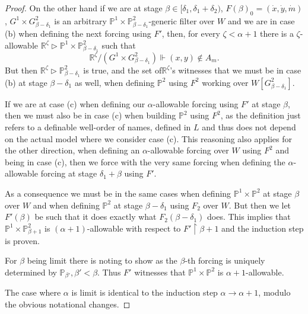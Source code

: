 \documentclass[a4paper,11pt]{article}
\newcommand{\forceP}{\mathbb{P}}
\newcommand{\forceR}{\mathbb{R}}
\begin{document}
\begin{proof}
On the other hand if we are at stage $\beta \in [\delta_1, \delta_1+\delta_2)$, $F({\beta})_0= (\dot{x},\dot{y}, \dot{m})$, $G^1 \times G^2_{\beta-\delta_1}$ is an arbitrary $\forceP^1 \times \forceP^2_{\beta-\delta_1}$-generic filter over $W$ and we are in case (b) when defining the next forcing using $F'$, then, for every $\zeta < \alpha+1$ there is a $\zeta$-allowable $\forceR^{\zeta}  \triangleright \forceP^1 \times \forceP^2_{{\beta-\delta_1}}$ such that
\[ \forceR^{\zeta}\slash (G^1 \times G^2_{\beta-\delta_1} )\Vdash ({x},{y}) \notin A_m.\]  But then $\forceR^{\zeta} \triangleright \forceP^2_{{\beta-\delta_1}}$ is true, and the set  of$\forceR^{\zeta}$'s witnesses that we must be in case (b) at stage $\beta-\delta_1$ as well, when defining $\forceP^2$ using $F^2$ working over $W[G^2_{\beta-\delta_1}]$.


If we are at case (c) when defining our  $\alpha$-allowable forcing using $F'$ at stage $\beta$, then we must also be in case (c) when building $\forceP^2$ using $F^2$, as the definition just refers to a definable well-order of names, defined in $L$ and thus does not depend on the actual  model where we consider case (c). This reasoning also applies for the other direction, when defining an $\alpha$-allowable forcing over $W$ using $F^2$ and being in case (c), then we force with the very same forcing when
defining the $\alpha$-allowable forcing at stage $\delta_1 +\beta$ using $F'$. 


As a consequence we must be in the same cases when defining $\forceP^1 \times \forceP^2$ at stage $\beta$ over $W$ and when defining $\forceP^2$ at stage $\beta -\delta_1$ using $F_2$ over $W$. But then we let $F'(\beta)$ be such that it does exactly what $F_2(\beta-\delta_1)$ does. This implies that $\forceP^1 \times \forceP^2_{\beta+1}$ is $(\alpha+1)$-allowable with respect to $F' \upharpoonright \beta+1$ and the induction step is proven.

For $\beta$ being limit there is noting to show as the $\beta$-th forcing is uniquely determined by $\forceP_{\beta'} , \beta' < \beta$. 
Thus $F'$ witnesses that $\forceP^1 \times \forceP^2$ is $\alpha+1$-allowable.

The case where $\alpha$ is limit is identical to the induction step $\alpha \rightarrow \alpha+1$, modulo the obvious notational changes.


\end{proof}
\end{document}
